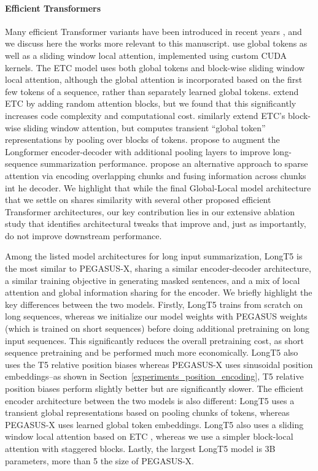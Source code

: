 \documentclass[11pt]{article}
\newcommand{\largemodel}{PEGASUS-X}
\begin{document}
\paragraph{Efficient Transformers}
Many efficient Transformer variants have been introduced in recent years \citep{tay2020efficient}, and we discuss here the works more relevant to this manuscript.
\citep{beltagy2020longformer} use global tokens as well as a sliding window local attention, implemented using custom CUDA kernels.
The ETC model \citep{ainslie2020etc} uses both global tokens and block-wise sliding window local attention, although the global attention is incorporated based on the first few tokens of a sequence, rather than separately learned global tokens.
\citet{zaheer2020bigbird} extend ETC by adding random attention blocks, but we found that this significantly increases code complexity and computational cost.
\citet{guo2021longt5} similarly extend ETC's block-wise sliding window attention, but computes transient ``global token'' representations by pooling over blocks of tokens.
\citet{pang2022topdown} propose to augment the Longformer encoder-decoder with additional pooling layers to improve long-sequence summarization performance.
\citet{ivgi2022sled} propose an alternative approach to sparse attention via encoding overlapping chunks and fusing information across chunks int he decoder.
We highlight that while the final Global-Local model architecture that we settle on shares similarity with several other proposed efficient Transformer architectures, our key contribution lies in our extensive ablation study that identifies architectural tweaks that improve and, just as importantly, do not improve downstream performance.

Among the listed model architectures for long input summarization, LongT5 \citep{guo2021longt5} is the most similar to \largemodel{}, sharing a similar encoder-decoder architecture, a similar training objective in generating masked sentences, and a mix of local attention and global information sharing for the encoder.
We briefly highlight the key differences between the two models.
Firstly, LongT5 trains from scratch on long sequences, whereas we initialize our model weights with PEGASUS weights (which is trained on short sequences) before doing additional pretraining on long input sequences.
This significantly reduces the overall pretraining cost, as short sequence pretraining and be performed much more economically.
LongT5 also uses the T5 relative position biases whereas \largemodel{} uses sinusoidal position embeddings--as shown in Section~\ref{experiments_position_encoding}, T5 relative position biases perform slightly better but are significantly slower.
The efficient encoder architecture between the two models is also different: LongT5 uses a transient global representations based on pooling chunks of tokens, whereas \largemodel{} uses learned global token embeddings.
LongT5 also uses a sliding window local attention based on ETC \citep{ainslie2020etc}, whereas we use a simpler block-local attention with staggered blocks.
Lastly, the largest LongT5 model is 3B parameters, more than 5 the size of \largemodel{}.
\end{document}
